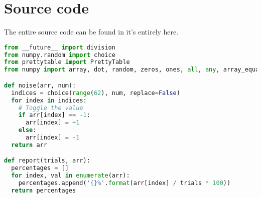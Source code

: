 \documentclass{article}
\begin{document}
\section{Source code}

The entire source code can be found in it's entirely here.

\begin{lstlisting}[language=Python]
from __future__ import division
from numpy.random import choice
from prettytable import PrettyTable
from numpy import array, dot, random, zeros, ones, all, any, array_equal, sum

def noise(arr, num):
  indices = choice(range(62), num, replace=False)
  for index in indices:
    # Toggle the value
    if arr[index] == -1:
      arr[index] = +1
    else:
      arr[index] = -1
  return arr

def report(trials, arr):
  percentages = []
  for index, val in enumerate(arr):
    percentages.append('{}%'.format(arr[index] / trials * 100))
  return percentages


\end{lstlisting}
\end{document}
